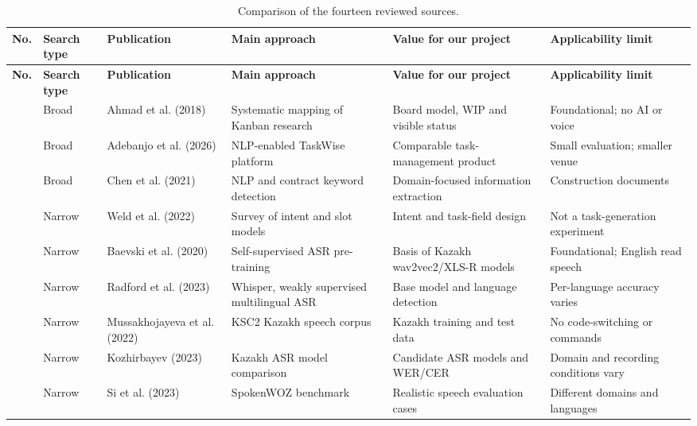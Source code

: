 \documentclass[11pt,a4paper]{article}
\begin{document}
\begingroup
\small
\setlength{\tabcolsep}{4pt}
\begin{longtable}{>{\raggedright\arraybackslash}p{0.6cm} >{\raggedright\arraybackslash}p{1.5cm} >{\raggedright\arraybackslash}p{2.5cm} >{\raggedright\arraybackslash}p{3.0cm} >{\raggedright\arraybackslash}p{3.1cm} >{\raggedright\arraybackslash}p{3.0cm}}
\caption{Comparison of the fourteen reviewed sources.}\label{tab:comparison}\\
\toprule
\textbf{No.} & \textbf{Search type} & \textbf{Publication} & \textbf{Main approach} & \textbf{Value for our project} & \textbf{Applicability limit} \\
\midrule
\endfirsthead
\toprule
\textbf{No.} & \textbf{Search type} & \textbf{Publication} & \textbf{Main approach} & \textbf{Value for our project} & \textbf{Applicability limit} \\
\midrule
\endhead
\cite{ahmad2018kanban} & Broad & Ahmad et al. (2018) & Systematic mapping of Kanban research & Board model, WIP and visible status & Foundational; no AI or voice \\
\cite{adebanjo2026taskwise} & Broad & Adebanjo et al. (2026) & NLP-enabled TaskWise platform & Comparable task-management product & Small evaluation; smaller venue \\
\cite{chen2021smart} & Broad & Chen et al. (2021) & NLP and contract keyword detection & Domain-focused information extraction & Construction documents \\
\cite{weld2022survey} & Narrow & Weld et al. (2022) & Survey of intent and slot models & Intent and task-field design & Not a task-generation experiment \\
\cite{baevski2020wav2vec} & Narrow & Baevski et al. (2020) & Self-supervised ASR pre-training & Basis of Kazakh wav2vec2/XLS-R models & Foundational; English read speech \\
\cite{radford2023whisper} & Narrow & Radford et al. (2023) & Whisper, weakly supervised multilingual ASR & Base model and language detection & Per-language accuracy varies \\
\cite{mussakhojayeva2022ksc2} & Narrow & Mussakhojayeva et al. (2022) & KSC2 Kazakh speech corpus & Kazakh training and test data & No code-switching or commands \\
\cite{kozhirbayev2023kazakh} & Narrow & Kozhirbayev (2023) & Kazakh ASR model comparison & Candidate ASR models and WER/CER & Domain and recording conditions vary \\
\cite{si2023spokenwoz} & Narrow & Si et al. (2023) & SpokenWOZ benchmark & Realistic speech evaluation cases & Different domains and languages \\

\end{longtable}
\end{document}
